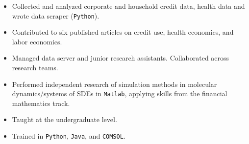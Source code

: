 \documentclass{clean_CV}
\begin{document}
\begin{itemize}
    \item Collected and analyzed corporate and household credit data, health data and wrote data scraper (\texttt{Python}).
    \item Contributed to six published articles on credit use, health economics, and labor economics.
    \item Managed data server and junior research assistants. Collaborated across research teams.
\end{itemize}

\medskip


\begin{itemize}
    \item Performed independent research of simulation methods in molecular dynamics/systems of SDEs in \texttt{Matlab}, applying skills from the financial mathematics track. %
    \item Taught at the undergraduate level.
    \item Trained in \texttt{Python}, \texttt{Java}, and \texttt{COMSOL}.
\end{itemize}
\end{document}
